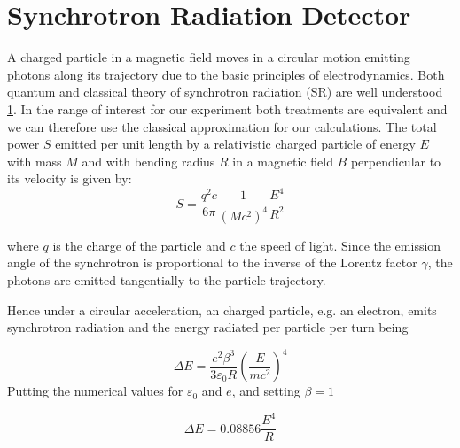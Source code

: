 \section{Synchrotron Radiation Detector}
A charged particle in a magnetic field moves in a circular motion emitting photons along its trajectory due to the basic
principles of electrodynamics. Both quantum and classical theory of synchrotron radiation (SR) are well understood
\ref{}. In the range of interest for our experiment both treatments are equivalent and we can therefore use the
classical approximation for our calculations. The total power $S$ emitted per unit length by a relativistic charged
particle of energy $E$ with mass $M$ and with bending radius $R$ in a magnetic field $B$ perpendicular to its
velocity is given by:
\begin{equation}
S = \frac{q^2c}{6\pi}\frac{1}{(Mc^2)^4}\frac{E^4}{R^2}
\end{equation}

where $q$ is the charge of the particle and $c$ the speed of light. Since the emission angle of the synchrotron is
proportional to the inverse of the Lorentz factor $\gamma$, the photons are emitted tangentially to the particle
trajectory.\par
Hence under a circular acceleration, an charged particle, e.g. an electron, emits synchrotron radiation and the energy radiated per
particle per turn being

\begin{equation}
\Delta E = \frac{e^2\beta^3}{3\varepsilon_0 R}\left (\frac{E}{mc^2}\right )^4
\end{equation}
Putting the numerical values for $\varepsilon_0$ and $e$, and setting $\beta=1$

\begin{equation}
\Delta E = 0.08856\frac{E^4}{R}
\end{equation}

